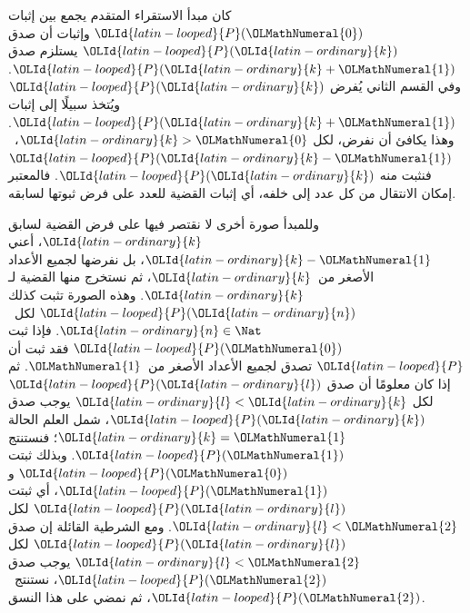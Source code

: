 \documentclass[../../../include/open-logic-section]{subfiles}
\begin{document}


كان مبدأ الاستقراء المتقدم يجمع بين إثبات $\OLId{latin-looped}{P}(\OLMathNumeral{0})$ وإثبات أن صدق
$\OLId{latin-looped}{P}(\OLId{latin-ordinary}{k})$ يستلزم صدق $\OLId{latin-looped}{P}(\OLId{latin-ordinary}{k}+\OLMathNumeral{1})$. وفي القسم الثاني يُفرض $\OLId{latin-looped}{P}(\OLId{latin-ordinary}{k})$ ويُتخذ
سبيلًا إلى إثبات $\OLId{latin-looped}{P}(\OLId{latin-ordinary}{k}+\OLMathNumeral{1})$. وهذا يكافئ أن نفرض، لكل $\OLId{latin-ordinary}{k}>\OLMathNumeral{0}$،~$\OLId{latin-looped}{P}(\OLId{latin-ordinary}{k}-\OLMathNumeral{1})$
فنثبت منه $\OLId{latin-looped}{P}(\OLId{latin-ordinary}{k})$. فالمعتبر إمكان الانتقال من كل عدد إلى خلفه، أي
إثبات القضية للعدد على فرض ثبوتها لسابقه.

وللمبدأ صورة أخرى لا نقتصر فيها على فرض القضية لسابق $\OLId{latin-ordinary}{k}$، أعني
$\OLId{latin-ordinary}{k}-\OLMathNumeral{1}$، بل نفرضها لجميع الأعداد الأصغر من~$\OLId{latin-ordinary}{k}$، ثم نستخرج منها القضية
لـ$\OLId{latin-ordinary}{k}$. وهذه الصورة تثبت كذلك $\OLId{latin-looped}{P}(\OLId{latin-ordinary}{n})$ لكل~$\OLId{latin-ordinary}{n} \in \Nat$. فإذا ثبت
$\OLId{latin-looped}{P}(\OLMathNumeral{0})$ فقد ثبت أن $\OLId{latin-looped}{P}$ تصدق لجميع الأعداد الأصغر من~$\OLMathNumeral{1}$. ثم إذا كان
معلومًا أن صدق $\OLId{latin-looped}{P}(\OLId{latin-ordinary}{l})$ لكل $\OLId{latin-ordinary}{l}<\OLId{latin-ordinary}{k}$ يوجب صدق $\OLId{latin-looped}{P}(\OLId{latin-ordinary}{k})$، شمل العلم الحالة
$\OLId{latin-ordinary}{k}=\OLMathNumeral{1}$؛ فنستنتج $\OLId{latin-looped}{P}(\OLMathNumeral{1})$. وبذلك ثبتت $\OLId{latin-looped}{P}(\OLMathNumeral{0})$ و$\OLId{latin-looped}{P}(\OLMathNumeral{1})$، أي ثبتت
$\OLId{latin-looped}{P}(\OLId{latin-ordinary}{l})$ لكل $\OLId{latin-ordinary}{l}<\OLMathNumeral{2}$. ومع الشرطية القائلة إن صدق $\OLId{latin-looped}{P}(\OLId{latin-ordinary}{l})$ لكل $\OLId{latin-ordinary}{l}<\OLMathNumeral{2}$ يوجب
صدق $\OLId{latin-looped}{P}(\OLMathNumeral{2})$، نستنتج~$\OLId{latin-looped}{P}(\OLMathNumeral{2})$، ثم نمضي على هذا النسق.
\end{document}
